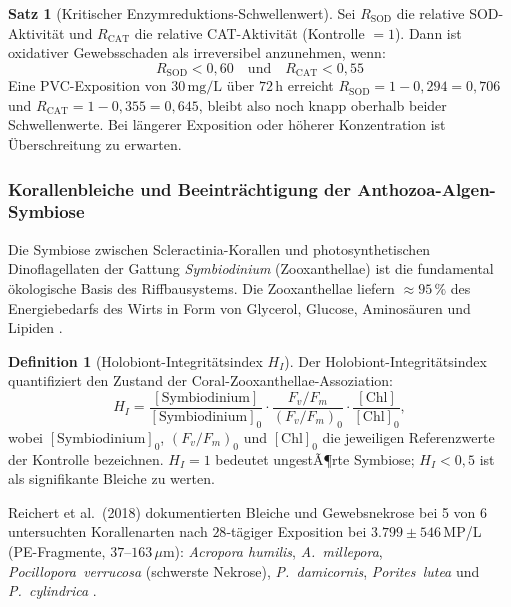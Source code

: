 ﻿\documentclass[12pt,a4paper]{article}
\theoremstyle{definition}
\newtheorem{definition}{Definition}[section]
\newtheorem{satz}{Satz}
\theoremstyle{remark}
\begin{document}
\begin{satz}[Kritischer Enzymreduktions-Schwellenwert]
Sei $R_{\text{SOD}}$ die relative SOD-Aktivit\"at und $R_{\text{CAT}}$ die relative
CAT-Aktivit\"at (Kontrolle $= 1$). Dann ist oxidativer Gewebsschaden als irreversibel
anzunehmen, wenn:
\begin{equation}
  R_{\text{SOD}} < 0{,}60 \quad \text{und} \quad R_{\text{CAT}} < 0{,}55
  \label{eq:threshold_enzym}
\end{equation}
Eine PVC-Exposition von $30\,\text{mg/L}$ \"uber $72\,\text{h}$ erreicht
$R_{\text{SOD}} = 1 - 0{,}294 = 0{,}706$ und
$R_{\text{CAT}} = 1 - 0{,}355 = 0{,}645$, bleibt also noch knapp oberhalb beider
Schwellenwerte. Bei l\"angerer Exposition oder h\"oherer Konzentration ist
\"Uberschreitung zu erwarten.
\end{satz}

\subsubsection{Korallenbleiche und Beeintr\"achtigung der Anthozoa-Algen-Symbiose}

Die Symbiose zwischen Scleractinia-Korallen und photosynthetischen Dinoflagellaten
der Gattung \textit{Symbiodinium} (Zooxanthellae) ist die fundamental
\"okologische Basis des Riffbausystems. Die Zooxanthellae liefern
${\approx}95\,\%$ des Energiebedarfs des Wirts in Form von Glycerol, Glucose,
Aminos\"auren und Lipiden \cite{muscatine1990role}.

\begin{definition}[Holobiont-Integrit\"atsindex $H_I$]
Der Holobiont-Integrit\"atsindex quantifiziert den Zustand der
Coral-Zooxanthellae-Assoziation:
\begin{equation}
  H_I = \frac{[\text{Symbiodinium}]}{[\text{Symbiodinium}]_0} \cdot
        \frac{F_v/F_m}{(F_v/F_m)_0} \cdot
        \frac{[\text{Chl}]}{[\text{Chl}]_0},
  \label{eq:holobiont_index}
\end{equation}
wobei $[\text{Symbiodinium}]_0$, $(F_v/F_m)_0$ und $[\text{Chl}]_0$ die jeweiligen
Referenzwerte der Kontrolle bezeichnen. $H_I = 1$ bedeutet ungestÃ¶rte Symbiose;
$H_I < 0{,}5$ ist als signifikante Bleiche zu werten.
\end{definition}

Reichert et al.\ (2018) dokumentierten Bleiche und Gewebsnekrose bei
5 von 6 untersuchten Korallenarten nach $28$-t\"agiger Exposition
bei $3.799 \pm 546$\,MP/L (PE-Fragmente, $37$--$163\,\mu$m):
\textit{Acropora humilis}, \textit{A.~millepora}, \textit{Pocillopora~verrucosa}
(schwerste Nekrose), \textit{P.~damicornis}, \textit{Porites~lutea} und
\textit{P.~cylindrica} \cite{reichert2018responses}.
\end{document}
